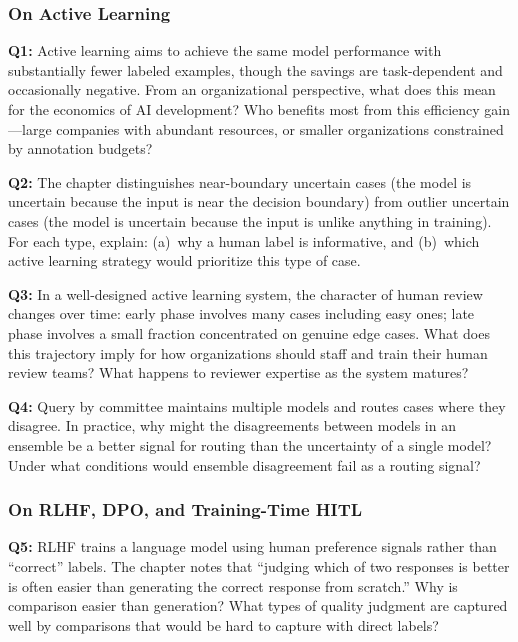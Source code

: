 \subsubsection*{On Active Learning}

\textbf{Q1:} Active learning aims to achieve the same model performance with substantially fewer labeled examples, though the savings are task-dependent and occasionally negative. From an organizational perspective, what does this mean for the economics of AI development? Who benefits most from this efficiency gain---large companies with abundant resources, or smaller organizations constrained by annotation budgets?

\textbf{Q2:} The chapter distinguishes near-boundary uncertain cases (the model is uncertain because the input is near the decision boundary) from outlier uncertain cases (the model is uncertain because the input is unlike anything in training). For each type, explain: (a)~why a human label is informative, and (b)~which active learning strategy would prioritize this type of case.

\textbf{Q3:} In a well-designed active learning system, the character of human review changes over time: early phase involves many cases including easy ones; late phase involves a small fraction concentrated on genuine edge cases. What does this trajectory imply for how organizations should staff and train their human review teams? What happens to reviewer expertise as the system matures?

\textbf{Q4:} Query by committee maintains multiple models and routes cases where they disagree. In practice, why might the disagreements between models in an ensemble be a better signal for routing than the uncertainty of a single model? Under what conditions would ensemble disagreement fail as a routing signal?

\subsubsection*{On RLHF, DPO, and Training-Time HITL}

\textbf{Q5:} RLHF trains a language model using human preference signals rather than ``correct'' labels. The chapter notes that ``judging which of two responses is better is often easier than generating the correct response from scratch.'' Why is comparison easier than generation? What types of quality judgment are captured well by comparisons that would be hard to capture with direct labels?

